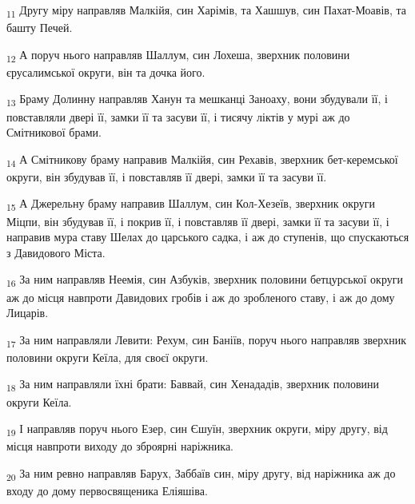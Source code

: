 \begin{tcolorbox}
\textsubscript{11} Другу міру направляв Малкійя, син Харімів, та Хашшув, син Пахат-Моавів, та башту Печей.
\end{tcolorbox}
\begin{tcolorbox}
\textsubscript{12} А поруч нього направляв Шаллум, син Лохеша, зверхник половини єрусалимської округи, він та дочка його.
\end{tcolorbox}
\begin{tcolorbox}
\textsubscript{13} Браму Долинну направляв Ханун та мешканці Заноаху, вони збудували її, і повставляли двері її, замки її та засуви її, і тисячу ліктів у мурі аж до Смітникової брами.
\end{tcolorbox}
\begin{tcolorbox}
\textsubscript{14} А Смітникову браму направив Малкійя, син Рехавів, зверхник бет-керемської округи, він збудував її, і повставляв її двері, замки її та засуви її.
\end{tcolorbox}
\begin{tcolorbox}
\textsubscript{15} А Джерельну браму направив Шаллум, син Кол-Хезеїв, зверхник округи Міцпи, він збудував її, і покрив її, і повставляв її двері, замки її та засуви її, і направив мура ставу Шелах до царського садка, і аж до ступенів, що спускаються з Давидового Міста.
\end{tcolorbox}
\begin{tcolorbox}
\textsubscript{16} За ним направляв Неемія, син Азбуків, зверхник половини бетцурської округи аж до місця навпроти Давидових гробів і аж до зробленого ставу, і аж до дому Лицарів.
\end{tcolorbox}
\begin{tcolorbox}
\textsubscript{17} За ним направляли Левити: Рехум, син Баніїв, поруч нього направляв зверхник половини округи Кеїла, для своєї округи.
\end{tcolorbox}
\begin{tcolorbox}
\textsubscript{18} За ним направляли їхні брати: Баввай, син Хенададів, зверхник половини округи Кеїла.
\end{tcolorbox}
\begin{tcolorbox}
\textsubscript{19} І направляв поруч нього Езер, син Єшуїн, зверхник округи, міру другу, від місця навпроти виходу до зброярні наріжника.
\end{tcolorbox}
\begin{tcolorbox}
\textsubscript{20} За ним ревно направляв Барух, Заббаїв син, міру другу, від наріжника аж до входу до дому первосвященика Еліяшіва.
\end{tcolorbox}
